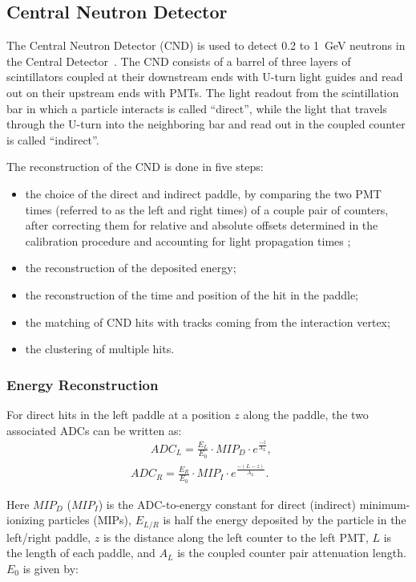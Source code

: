 \subsection{Central Neutron Detector}
\label{sec_rec_cnd}

The Central Neutron Detector (CND) is used to detect 0.2 to 1~GeV neutrons in the Central Detector~\cite{cnd-nim}.
The CND consists of a barrel of three layers of scintillators coupled at their downstream ends with U-turn light
guides and read out on their upstream ends with PMTs. The light readout from the scintillation bar in which a particle
interacts is called ``direct'', while the light that travels through the U-turn into the neighboring bar and read out
in the coupled counter is called ``indirect''. 

The reconstruction of the CND is done in five steps:

\begin{itemize}
\item the choice of the direct and indirect paddle, by comparing the two PMT times (referred to as the left and
  right times) of a couple pair of counters, after correcting them for relative and absolute offsets determined in
  the calibration procedure and accounting for light propagation times \cite{cnd-nim};
\item the reconstruction of the deposited energy;
\item the reconstruction of the time and position of the hit in the paddle;
\item the matching of CND hits with tracks coming from the interaction vertex;
\item the clustering of multiple hits.
\end{itemize}

\subsubsection{Energy Reconstruction}

For direct hits in the left paddle at a position $z$ along the paddle, the two associated ADCs can be written as:
\begin{multline}
\label{eq_adc}
~~~~~~~~ADC_L = \frac{E_L}{E_0} \cdot MIP_D \cdot e^{\frac{-z}{A_L}},\\
ADC_R = \frac{E_R}{E_0} \cdot MIP_I \cdot e^{\frac{-(L-z)}{A_L}}.~~~~~~~
\end{multline}

\noindent
Here $MIP_D$ ($MIP_I$) is the ADC-to-energy constant for direct (indirect) minimum-ionizing particles (MIPs),
$E_{L/R}$ is half the energy deposited by the particle in the left/right paddle, $z$ is the distance along the
left counter to the left PMT, $L$ is the length of each paddle, and $A_L$ is the coupled counter pair attenuation
length. $E_0$ is given by:

